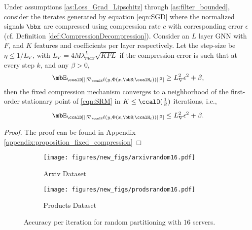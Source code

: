 \documentclass[lettersize,journal]{IEEEtran}
\newcommand{\lipGrad}{L_\nabla}
\begin{document}
\begin{proposition}\label{prop:fixed_compression}
	Under assumptions \ref{as:Loss_Grad_Lipschitz} through \ref{as:filter_bounded}, consider the iterates generated by equation \eqref{eqn:SGD} where the normalized signals $\bbx$ are compressed using compression rate $c$ with corresponding error $\epsilon$(cf. Definition \ref{def:CompressionDecompression}). Consider an $L$ layer GNN with $F$, and $K$ features and coefficients per layer respectively. Let the step-size  be $\eta\leq 1/\lipGrad$, with $\lipGrad=4M\lambda_{max}^L\sqrt{KFL}$ if the compression error is such that at every step $k$, and any $\beta>0$,
	\begin{align}
		\mbE_\ccalD[||\nabla_\ccalH \ell (y,\Phi(x,\bbS;\ccalH_t)) ||^2] \geq \lipGrad^2\epsilon^2  +\beta,
	\end{align}
	then the fixed compression mechanism converges to a neighborhood of the first-order stationary point of \ref{eqn:SRM} in $K\leq \ccalO(\frac{1}{\beta})$ iterations, i.e., 
	\begin{align}
		\mbE_\ccalD[|| \nabla_\ccalH \ell (y,\Phi(x,\bbS;\ccalH_t))||^2]\leq \lipGrad^2\epsilon^2 +\beta.
	\end{align}
\end{proposition}
\begin{proof}
	The proof can be found in Appendix \ref{appendix:proposition_fixed_compression}
\end{proof}


\begin{figure*}
	\begin{subfigure}{0.5\textwidth}
		\centering
		\texttt{[image: figures/new\_figs/arxivrandom16.pdf]}
		\caption{Arxiv Dataset}
		\label{fig:acc_arxiv}
	\end{subfigure}%
	\begin{subfigure}{0.5\textwidth}
		\centering
		\texttt{[image: figures/new\_figs/prodsrandom16.pdf]}
		\caption{Products Dataset}
		\label{fig:acc_prods}
	\end{subfigure}
	\caption{Accuracy per iteration for random partitioning with $16$ servers.}
	\label{fig:acc_random_16}
\end{figure*}
\end{document}
